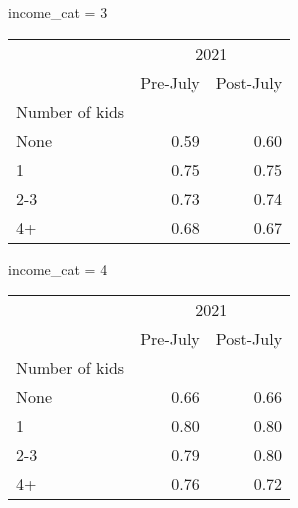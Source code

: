income_cat = 3
\begin{tabular}{lll}
\cline{1-3}
\multicolumn{1}{c}{} &
  \multicolumn{2}{|c}{2021} \\
\multicolumn{1}{c}{} &
  \multicolumn{1}{|r}{Pre-July} &
  \multicolumn{1}{r}{Post-July} \\
\cline{1-3}
\multicolumn{1}{l}{Number of kids} &
  \multicolumn{1}{|r}{} &
  \multicolumn{1}{r}{} \\
\multicolumn{1}{l}{\hspace{1em}None} &
  \multicolumn{1}{|r}{0.59} &
  \multicolumn{1}{r}{0.60} \\
\multicolumn{1}{l}{\hspace{1em}1} &
  \multicolumn{1}{|r}{0.75} &
  \multicolumn{1}{r}{0.75} \\
\multicolumn{1}{l}{\hspace{1em}2-3} &
  \multicolumn{1}{|r}{0.73} &
  \multicolumn{1}{r}{0.74} \\
\multicolumn{1}{l}{\hspace{1em}4+} &
  \multicolumn{1}{|r}{0.68} &
  \multicolumn{1}{r}{0.67} \\
\cline{1-3}
\end{tabular}

income_cat = 4
\begin{tabular}{lll}
\cline{1-3}
\multicolumn{1}{c}{} &
  \multicolumn{2}{|c}{2021} \\
\multicolumn{1}{c}{} &
  \multicolumn{1}{|r}{Pre-July} &
  \multicolumn{1}{r}{Post-July} \\
\cline{1-3}
\multicolumn{1}{l}{Number of kids} &
  \multicolumn{1}{|r}{} &
  \multicolumn{1}{r}{} \\
\multicolumn{1}{l}{\hspace{1em}None} &
  \multicolumn{1}{|r}{0.66} &
  \multicolumn{1}{r}{0.66} \\
\multicolumn{1}{l}{\hspace{1em}1} &
  \multicolumn{1}{|r}{0.80} &
  \multicolumn{1}{r}{0.80} \\
\multicolumn{1}{l}{\hspace{1em}2-3} &
  \multicolumn{1}{|r}{0.79} &
  \multicolumn{1}{r}{0.80} \\
\multicolumn{1}{l}{\hspace{1em}4+} &
  \multicolumn{1}{|r}{0.76} &
  \multicolumn{1}{r}{0.72} \\
\cline{1-3}
\end{tabular}

